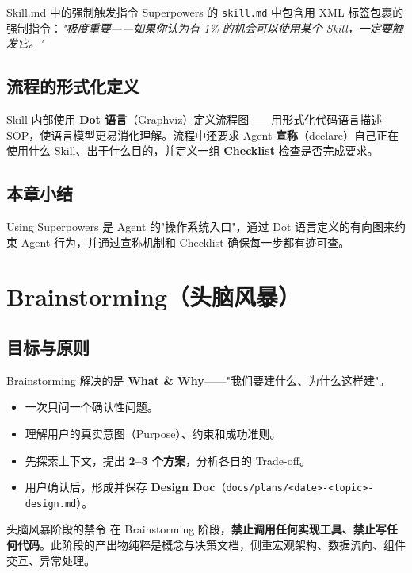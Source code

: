 \documentclass[a4paper]{article}
\begin{document}
\begin{importantbox}{Skill.md 中的强制触发指令}
Superpowers 的 \texttt{skill.md} 中包含用 XML 标签包裹的强制指令：\textit{"极度重要——如果你认为有 1\% 的机会可以使用某个 Skill，一定要触发它。"}
\end{importantbox}

\subsection{流程的形式化定义}

Skill 内部使用 \textbf{Dot 语言}（Graphviz）定义流程图——用形式化代码语言描述 SOP，使语言模型更易消化理解。流程中还要求 Agent \textbf{宣称}（declare）自己正在使用什么 Skill、出于什么目的，并定义一组 \textbf{Checklist} 检查是否完成要求。

\subsection{本章小结}

Using Superpowers 是 Agent 的"操作系统入口"，通过 Dot 语言定义的有向图来约束 Agent 行为，并通过宣称机制和 Checklist 确保每一步都有迹可查。


\section{Brainstorming（头脑风暴）}

\subsection{目标与原则}

Brainstorming 解决的是 \textbf{What \& Why}——"我们要建什么、为什么这样建"。

\begin{itemize}
    \item 一次只问一个确认性问题。
    \item 理解用户的真实意图（Purpose）、约束和成功准则。
    \item 先探索上下文，提出 \textbf{2--3 个方案}，分析各自的 Trade-off。
    \item 用户确认后，形成并保存 \textbf{Design Doc}（\texttt{docs/plans/<date>-<topic>-design.md}）。
\end{itemize}

\begin{warningbox}{头脑风暴阶段的禁令}
在 Brainstorming 阶段，\textbf{禁止调用任何实现工具、禁止写任何代码}。此阶段的产出物纯粹是概念与决策文档，侧重宏观架构、数据流向、组件交互、异常处理。
\end{warningbox}
\end{document}

